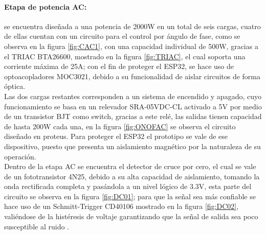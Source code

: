 	\paragraph{Etapa de potencia AC:}
		se encuentra diseñada a una potencia de 2000W en un total de seis cargas, cuatro de ellas cuentan con un circuito para el control por ángulo de fase, como se observa en la figura \ref{fig:CAC1}, con una capacidad individual de 500W, gracias a el TRIAC BTA26600, mostrado en la figura \ref{fig:TRIAC}, el cual soporta una corriente máxima de 25A; con el fin de proteger el ESP32, se hace uso de optoacopladores MOC3021, debido a su funcionalidad de aislar circuitos de forma óptica.\\
		
%	
%	
		Las dos cargas restantes corresponden a un sistema de encendido y apagado, cuyo funcionamiento se basa en un relevador SRA-05VDC-CL activado a 5V por medio de un transistor BJT como switch, gracias a este relé, las salidas tienen capacidad de hasta 200W cada una, en la figura \ref{fig:ONOFAC} se observa el circuito diseñado en proteus. Para proteger el ESP32 el prototipo se vale de ese dispositivo, puesto que presenta un aislamiento magnético por la naturaleza de su operación.\\
	
	
		Dentro de la etapa AC se encuentra el detector de cruce por cero, el cual se vale de un fototransistor 4N25, debido a su alta capacidad de aislamiento, tomando la onda rectificada completa y pasándola a un nivel lógico de 3.3V, esta parte del circuito se observa en la figura \ref{fig:DC01}; para que la señal sea más confiable se hace uso de un Schmitt-Trigger CD40106 mostrado en la figura \ref{fig:DC02}, valiéndose de la histéresis de voltaje garantizando que la señal de salida sea poco susceptible al ruido \cite{DC0}.\\
		
